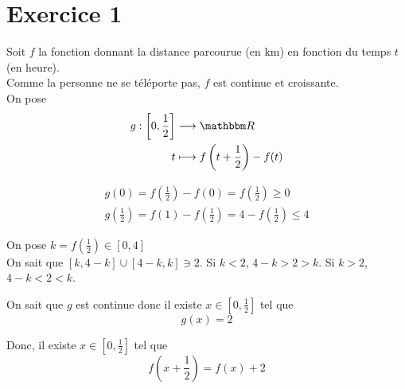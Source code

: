 \part{Exercice 1}

Soit $f$ la fonction donnant la distance parcourue (en km) en fonction du temps $t$ (en heure).\\
Comme la personne ne se téléporte pas, $f$ est continue et croissante.\\
On pose \begin{align*}
	g: \left[0,\frac{1}{2}\right] &\longrightarrow \R \\
	t &\longmapsto f\left( t + \frac{1}{2} \right) - f(t)
\end{align*}

\begin{align*}
	g(0) = f\left( \frac{1}{2} \right) - f(0) = f\left( \frac{1}{2} \right) \ge 0\\
	g\left( \frac{1}{2} \right) = f(1) - f\left( \frac{1}{2} \right) = 4 - f\left(\frac{1}{2}\right) \le 4
\end{align*}

On pose $k = f\left( \frac{1}{2} \right) \in [0,4]$\\

On sait que $[k,4-k] \cup [4-k,k] \ni 2$.
Si $k < 2$, $4-k > 2 > k$.
Si $k > 2$, $4-k < 2 < k$.

On sait que $g$ est continue donc il existe $x \in \left[0,\frac{1}{2}\right]$ tel que \[
	g(x) = 2
\]

Donc, il existe $x \in \left[0,\frac{1}{2}\right]$ tel que \[
	f\left( x + \frac{1}{2} \right) = f(x) + 2 
\] 
